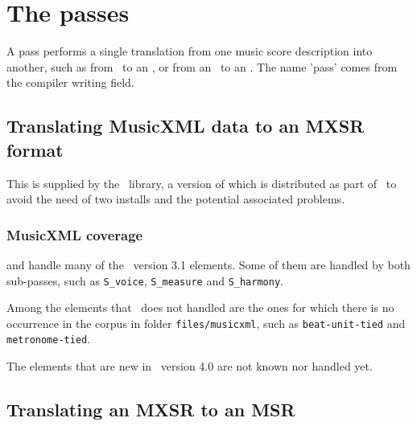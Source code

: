 
\chapter{The passes}

A pass performs a single translation from one music score description into another, such as from \mxml\ to an \mxsrRepr, or from an \mxsrRepr\ to an \msrRepr. The name 'pass' comes from the compiler writing field.


\section{Translating MusicXML data to an MXSR format}

This is supplied by the \libmusicxml\ library, a version of which is distributed as part of \mf\ to avoid the need of two installs and the potential associated problems.


\subsection{MusicXML coverage}\label{MusicXML coverage}

 and  handle many of the \mxml\ version 3.1 elements. Some of them are handled by both sub-passes, such as {\tt S_voice}, {\tt S_measure} and {\tt S_harmony}.

Among the elements that \mf\ does not handled are the ones for which there is no occurrence in the corpus in folder {\tt files/musicxml}, such as {\tt beat-unit-tied} and {\tt metronome-tied}.

The elements that are new in \mxml\ version 4.0 are not known nor handled yet.


\section{Translating an MXSR to an MSR}

